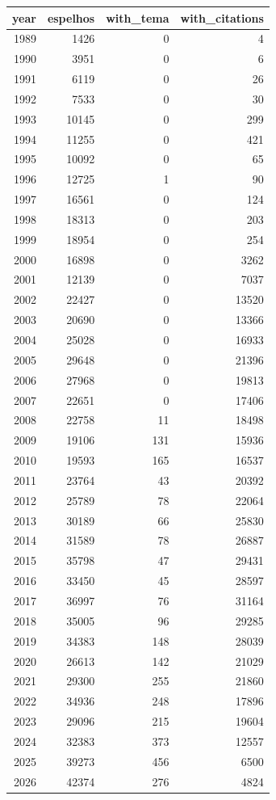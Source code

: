 \begin{table}[htbp]
\centering
\label{tab:espelhos_by_year}
\begin{tabular}{rrrr}
\toprule
year & espelhos & with\_tema & with\_citations \\
\midrule
1989 & 1426 & 0 & 4 \\
1990 & 3951 & 0 & 6 \\
1991 & 6119 & 0 & 26 \\
1992 & 7533 & 0 & 30 \\
1993 & 10145 & 0 & 299 \\
1994 & 11255 & 0 & 421 \\
1995 & 10092 & 0 & 65 \\
1996 & 12725 & 1 & 90 \\
1997 & 16561 & 0 & 124 \\
1998 & 18313 & 0 & 203 \\
1999 & 18954 & 0 & 254 \\
2000 & 16898 & 0 & 3262 \\
2001 & 12139 & 0 & 7037 \\
2002 & 22427 & 0 & 13520 \\
2003 & 20690 & 0 & 13366 \\
2004 & 25028 & 0 & 16933 \\
2005 & 29648 & 0 & 21396 \\
2006 & 27968 & 0 & 19813 \\
2007 & 22651 & 0 & 17406 \\
2008 & 22758 & 11 & 18498 \\
2009 & 19106 & 131 & 15936 \\
2010 & 19593 & 165 & 16537 \\
2011 & 23764 & 43 & 20392 \\
2012 & 25789 & 78 & 22064 \\
2013 & 30189 & 66 & 25830 \\
2014 & 31589 & 78 & 26887 \\
2015 & 35798 & 47 & 29431 \\
2016 & 33450 & 45 & 28597 \\
2017 & 36997 & 76 & 31164 \\
2018 & 35005 & 96 & 29285 \\
2019 & 34383 & 148 & 28039 \\
2020 & 26613 & 142 & 21029 \\
2021 & 29300 & 255 & 21860 \\
2022 & 34936 & 248 & 17896 \\
2023 & 29096 & 215 & 19604 \\
2024 & 32383 & 373 & 12557 \\
2025 & 39273 & 456 & 6500 \\
2026 & 42374 & 276 & 4824 \\
\bottomrule
\end{tabular}
\end{table}
